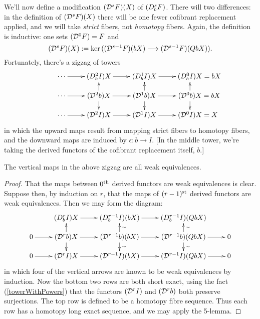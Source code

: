 \documentclass[10pt]{article}
\newcommand{\dupdown}[2]{D^{\smash{#1}}_{\smash{#2}}}
\newcommand{\caldup}[1]{\calD^{\smash{#1}}}
\begin{document}
\begin{convergence}
We'll now define a modification $(\caldup{s}F)(X)$ of $(\dupdown{s}{b}F)$. There will two differences: in the definition of $(\caldup{s}F)(X)$ there will be one fewer cofibrant replacement applied, and we will take \emph{strict} fibers, not \emph{homotopy} fibers. Again, the definition is inductive: one sets $(\caldup{0}F)=F$ and
\[(\caldup{s}F)(X):=\ker((\caldup{s-1}F)(bX)\to (\caldup{s-1}F)(QbX)).\]
Fortunately, there's a zigzag of towers
\[\xymatrix@R=4mm{
\cdots 
\ar[r]
&%
(\dupdown{2}{b}I)X
\ar[r]
&%
(\dupdown{1}{b}I)X
\ar[r]&%
(\dupdown{0}{b}I)X\makebox[0pt][l]{$\mbox{}=bX$}\\
\cdots 
\ar[r]
&%
(\caldup{2}b)X
\ar[u]_-{}
\ar[d]^-{}
\ar[r]
&%
(\caldup{1}b)X
\ar[u]_-{}
\ar[d]^-{}
\ar[r]&%
(\caldup{0}b)X\makebox[0pt][l]{$\mbox{}=bX$}
\ar[u]_-{}
\ar[d]^-{}\\
\cdots 
\ar[r]
&%
(\caldup{2}I)X
\ar[r]
&%
(\caldup{1}I)X
\ar[r]&%
(\caldup{0}I)X\makebox[0pt][l]{$\mbox{}=X$}
}\]
in which the upward maps result from mapping strict fibers to homotopy fibers, and the downward maps are induced by $\epsilon:b\to I$. [In the middle tower, we're taking the derived functors of the cofibrant replacement itself, $b$.]
%

\begin{prop}\label{verticalsEquivsInDvCALD}
The vertical maps in the above zigzag are all weak equivalences.
\end{prop}
\begin{proof}
That the maps between $0^\textup{th}$ derived functors are weak equivalences is clear. Suppose then, by induction on $r$, that the maps of $(r-1)^\textup{st}$ derived functors are weak equivalences. Then we may form the diagram:
\[\xymatrix@R=4mm{
&
(\dupdown{r}{b}I)X\ar[r]&
(\dupdown{r-1}{b}I)(bX)\ar[r]&
(\dupdown{r-1}{b}I)(QbX)&
\\
0\ar[r]&
(\caldup{r}b)X\ar[d]\ar[u]\ar[r]&
(\caldup{r-1}b)(bX)\ar[d]^{\sim}\ar[u]_{\sim}\ar[r]&
(\caldup{r-1}b)(QbX)\ar[d]^{\sim}\ar[u]_{\sim}\ar[r]&
0\\
0\ar[r]&
(\caldup{r}I)X\ar[r]&
(\caldup{r-1}I)(bX)\ar[r]&
(\caldup{r-1}I)(QbX)\ar[r]&
0
}\]
in which four of the vertical arrows are known to be weak equivalences by induction.
Now the bottom two rows are both short exact, using the fact (\ref{towerWithPowers}) that the functors $(\caldup{r}I)$ and $(\caldup{r}b)$ both preserve surjections. The top row is defined to be a homotopy fibre sequence. Thus each row has a homotopy long exact sequence, and we may apply the 5-lemma.
\end{proof}












\end{convergence}
\end{document}
